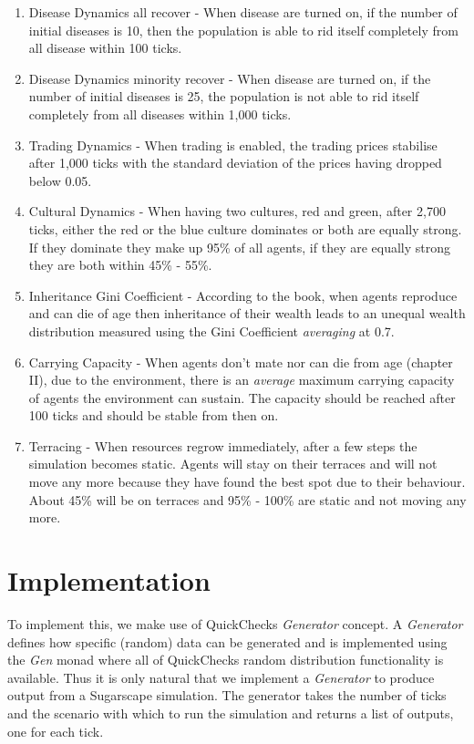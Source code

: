 \begin{enumerate}
	\item Disease Dynamics all recover - When disease are turned on, if the number of initial diseases is 10, then the population is  able to rid itself completely from all disease within 100 ticks. 
	
	\item Disease Dynamics minority recover - When disease are turned on, if the number of initial diseases is 25, the population is not able to rid itself completely from all diseases within 1,000 ticks.
	
	\item Trading Dynamics - When trading is enabled, the trading prices stabilise after 1,000 ticks with the standard deviation of the prices having dropped below 0.05.
	
	\item Cultural Dynamics - When having two cultures, red and green, after 2,700 ticks, either the red or the blue culture dominates or both are equally strong. If they dominate they make up 95\% of all agents, if they are equally strong they are both within 45\% - 55\%.
	
	\item Inheritance Gini Coefficient - According to the book, when agents reproduce and can die of age then inheritance of their wealth leads to an unequal wealth distribution measured using the Gini Coefficient \textit{averaging} at 0.7.
	
	\item Carrying Capacity - When agents don't mate nor can die from age (chapter II), due to the environment, there is an \textit{average} maximum carrying capacity of agents the environment can sustain. The capacity should be reached after 100 ticks and should be stable from then on.
		
	\item Terracing - When resources regrow immediately, after a few steps the simulation becomes static. Agents will stay on their terraces and will not move any more because they have found the best spot due to their behaviour. About 45\% will be on terraces and 95\% - 100\% are static and not moving any more.
\end{enumerate}

\section{Implementation}
To implement this, we make use of QuickChecks \textit{Generator} concept. A \textit{Generator} defines how specific (random) data can be generated and is implemented using the \textit{Gen} monad where all of QuickChecks random distribution functionality is available. Thus it is only natural that we implement a \textit{Generator} to produce output from a Sugarscape simulation. The generator takes the number of ticks and the scenario with which to run the simulation and returns a list of outputs, one for each tick.


